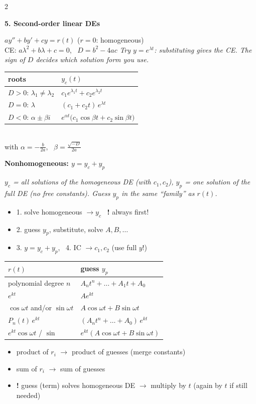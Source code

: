 \documentclass[10pt]{article}
\newcommand{\sect}[2]{%
  \par\vspace{12pt}\noindent                      %
  \colorbox{#1}{\parbox{\dimexpr\columnwidth-2\fboxsep}{\color{white}\bfseries #2}}%
  \par\vspace{4pt}}                               %
\newcommand{\sub}[1]{\par\vspace{7pt}\textbf{#1}\par\vspace{2pt}}  %
\newcommand{\expl}[1]{{\color{gray!80!black}\itshape #1}\par}
\newcommand{\warn}[1]{{\color{BrickRed}\textbf{!} #1}}
\begin{document}
\begin{multicols}{2}
\sect{cDE2}{5. Second-order linear DEs}
$ay''+by'+cy=r(t)$ \quad ($r=0$: homogeneous)\\
CE: $a\lambda^2+b\lambda+c=0$, \ $D=b^2-4ac$
\expl{Try $y=e^{\lambda t}$: substituting gives the CE. The sign of $D$ decides which solution form you use.}

\renewcommand{\arraystretch}{1.35}
\begin{tabular}{@{}p{}p{}@{}}
\toprule
roots & $y_c(t)$\\\midrule
$D>0$: $\lambda_1\neq\lambda_2$ & $c_1e^{\lambda_1t}+c_2e^{\lambda_2t}$\\
$D=0$: $\lambda$ & $(c_1+c_2t)\,e^{\lambda t}$\\
$D<0$: $\alpha\pm\beta i$ & $e^{\alpha t}\big(c_1\cos\beta t+c_2\sin\beta t\big)$\\\bottomrule
\end{tabular}\\
with $\alpha=-\frac{b}{2a}$, \ $\beta=\frac{\sqrt{-D}}{2a}$

\sub{Nonhomogeneous: $y=y_c+y_p$}
\expl{$y_c$ = all solutions of the homogeneous DE (with $c_1,c_2$), $y_p$ = \emph{one} solution of the full DE (no free constants). Guess $y_p$ in the same ``family'' as $r(t)$.}
\begin{itemize}
  \item 1. solve homogeneous $\rightarrow y_c$ \ \warn{always first!}
  \item 2. guess $y_p$, substitute, solve $A,B,\dots$
  \item 3. $y=y_c+y_p$, \ 4. IC $\rightarrow c_1,c_2$ (use full $y$!)
\end{itemize}

\renewcommand{\arraystretch}{1.3}
\begin{tabular}{@{}p{}p{}@{}}
\toprule
$r(t)$ & guess $y_p$\\\midrule
polynomial degree $n$ & $A_nt^n+\dots+A_1t+A_0$\\
$e^{kt}$ & $Ae^{kt}$\\
$\cos\omega t$ and/or $\sin\omega t$ & $A\cos\omega t+B\sin\omega t$\\
$P_n(t)\,e^{kt}$ & $(A_nt^n+\dots+A_0)\,e^{kt}$\\
$e^{kt}\cos\omega t$ / $\sin$ & $e^{kt}(A\cos\omega t+B\sin\omega t)$\\\bottomrule
\end{tabular}
\begin{itemize}
  \item product of $r_i$ $\rightarrow$ product of guesses (merge constants)
  \item sum of $r_i$ $\rightarrow$ sum of guesses
  \item \warn{guess (term) solves homogeneous DE $\rightarrow$ multiply by $t$ (again by $t$ if still needed)}
\end{itemize}


\end{multicols}
\end{document}
